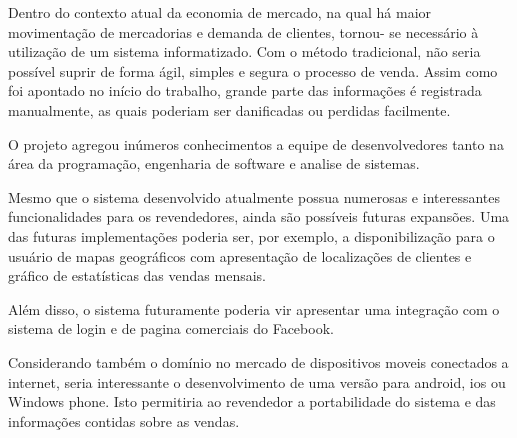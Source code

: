 \documentclass[chapter=TITLE,12pt,oneside,a4paper,english,french,sumario=tradicional,spanish,brazil,]{abntex2}
\begin{document}
Dentro do contexto atual da economia de mercado, na qual há maior movimentação de mercadorias e demanda de clientes, tornou- se necessário à utilização de um sistema informatizado. Com o método tradicional, não seria possível suprir de forma ágil, simples e segura o processo de venda. Assim como foi apontado no início do trabalho, grande parte das informações é registrada manualmente, as quais poderiam ser danificadas ou perdidas facilmente.

O projeto agregou inúmeros conhecimentos a equipe de desenvolvedores tanto na área da programação, engenharia de software e analise de sistemas.

Mesmo que o sistema desenvolvido atualmente possua numerosas e  interessantes funcionalidades para os revendedores, ainda são possíveis futuras expansões. Uma das futuras implementações poderia ser, por exemplo, a disponibilização para o usuário de mapas geográficos com apresentação de localizações de clientes e gráfico de estatísticas das vendas mensais.

Além disso, o sistema futuramente poderia vir apresentar uma integração com o sistema de login e de pagina comerciais do Facebook.

Considerando também o domínio no mercado de dispositivos moveis conectados a internet, seria interessante o desenvolvimento de uma versão para android, ios ou Windows phone. Isto permitiria ao revendedor a portabilidade do sistema e das informações contidas sobre as vendas.
\end{document}
